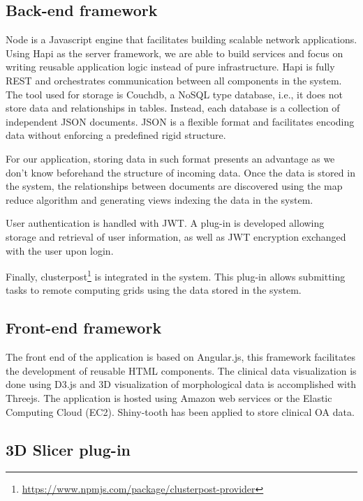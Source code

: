 \documentclass[]{spie}  %
\begin{document}
\subsection{Back-end framework}

Node is a Javascript engine that facilitates building 
scalable network applications. 
Using Hapi as the server framework, we are able to build 
services and focus on writing reusable application logic instead 
of pure infrastructure. 
Hapi is fully REST and orchestrates communication between all components in the system.
The tool used for storage is Couchdb, a NoSQL type database, i.e., 
it does not store data and relationships in tables. Instead, 
each database is a collection of independent JSON documents. JSON is a flexible format 
and facilitates encoding data without enforcing a predefined rigid structure. 

For our application, storing data in such format presents an advantage
as we don't know beforehand the structure of incoming data. 
Once the data is stored in the system, the relationships between documents are discovered using 
the map reduce algorithm and generating views indexing the data in the system. 

User authentication is handled with JWT. A plug-in 
is developed allowing storage and retrieval of user information, as well 
as JWT encryption exchanged with the user upon login. 

Finally, clusterpost\footnote{\url{https://www.npmjs.com/package/clusterpost-provider}} is
integrated in the system. This plug-in allows 
submitting tasks to remote computing grids using the data stored in the system.

\subsection{Front-end framework}

The front end of the application is based on Angular.js, this framework facilitates the development of reusable HTML components.
The clinical data visualization is done using D3.js and 3D visualization of morphological data is accomplished with Threejs.
The application is hosted using Amazon web services or the Elastic Computing Cloud (EC2). Shiny-tooth has been applied to store clinical OA data. 

\subsection{3D Slicer plug-in}
\end{document}
